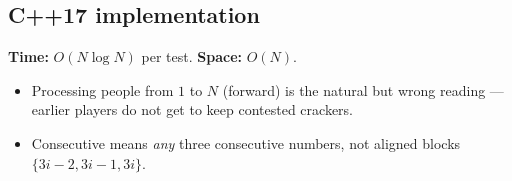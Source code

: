 
\subsection*{C++17 implementation}

\begin{complexitybox}
\textbf{Time:} $O(N\log N)$ per test. \textbf{Space:} $O(N)$.
\end{complexitybox}

\begin{pitfallbox}
\begin{itemize}
  \item Processing people from $1$ to $N$ (forward) is the natural but
        wrong reading --- earlier players do not get to keep contested
        crackers.
  \item Consecutive means \emph{any} three consecutive numbers, not aligned
        blocks $\{3i-2,3i-1,3i\}$.
\end{itemize}
\end{pitfallbox}
